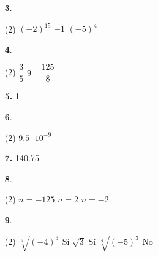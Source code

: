 \documentclass[a4paper, pdf, twoside]{book}
\begin{document}
\begin{multicols}{2}
\begin{enumerate}

 \item[\fontfamily{phv}\selectfont\color{blue}\textbf{3}. ]  \scalebox{0.6}{\simbolclau } 
 \begin{tasks}[column-sep=1em, item-indent=1.3333em](2)
	 \task $(-2)^{15}$
	 \task $-1$
	 \task $(-5)^{4}$
\end{tasks}
\vspace{0.25cm}



 \item[\fontfamily{phv}\selectfont\color{blue}\textbf{4}. ]  \scalebox{0.6}{\simbolclau } 
 \begin{tasks}[column-sep=1em, item-indent=1.3333em](2)
	 \task $\dfrac {3}{5}$
	 \task $9$
	 \task $-\dfrac {125}{8}$
\end{tasks}
\vspace{0.25cm}
\item[\fontfamily{phv}\selectfont\color{blue}\textbf{5. }]  \scalebox{0.6}{\simbolclau } 
1
\vspace{0.25cm}



 \item[\fontfamily{phv}\selectfont\color{blue}\textbf{6}. ]  \scalebox{0.6}{\simbolclau } 
 \begin{tasks}[column-sep=1em, item-indent=1.3333em](2)
	 \task $9.5 \cdot 10^{-9}$
\end{tasks}
\vspace{0.25cm}
\item[\fontfamily{phv}\selectfont\color{blue}\textbf{7. }]  \scalebox{0.6}{\simbolclau } 
140.75
\vspace{0.25cm}



 \item[\fontfamily{phv}\selectfont\color{blue}\textbf{8}. ]  \scalebox{0.6}{\simbolclau } 
 \begin{tasks}[column-sep=1em, item-indent=1.3333em](2)
	 \task $n=-125$
	 \task $n=2$
	 \task $n=-2$
\end{tasks}
\vspace{0.25cm}



 \item[\fontfamily{phv}\selectfont\color{blue}\textbf{9}. ]  \scalebox{0.6}{\simbolclau } 
 \begin{tasks}[column-sep=1em, item-indent=1.3333em](2)
	 \task* $\sqrt [{5}]{\left (-4\right )^{3}}$ Sí
	 \task $\sqrt {3}$ Sí
	 \task* $\sqrt [{4}]{\left (-5\right )^{3} }$ No
\end{tasks}
\vspace{0.25cm}



\end{enumerate}
\end{multicols}
\end{document}
